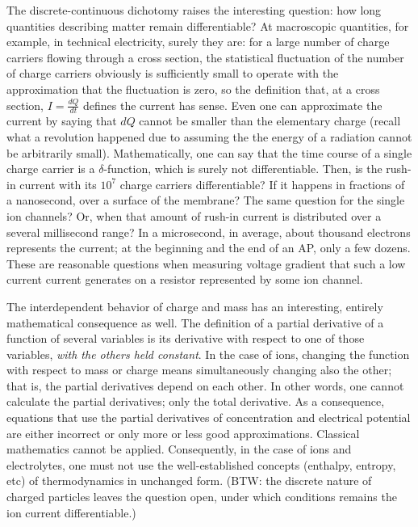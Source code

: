 {
The discrete-continuous dichotomy raises the interesting question: how long quantities describing matter remain differentiable? At macroscopic quantities, for example, 
in technical electricity, surely they are: for a large number of
charge carriers flowing through a cross section, the statistical
fluctuation of the number of charge carriers obviously is sufficiently small to operate with the approximation that
the fluctuation is zero, so the definition that, at a cross section, $I=\frac{dQ}{dt}$ defines the current has sense.
Even one can approximate the current by saying that
$dQ$ cannot be smaller than the elementary charge 
(recall what a revolution happened due to assuming
the the energy of a radiation cannot be arbitrarily small). Mathematically, one can say that the time course of a single
charge carrier is a $\delta$-function, which is surely not differentiable. Then, is the rush-in current with its 
$10^7$ charge carriers differentiable? If it happens 
in fractions of a nanosecond, over a surface of the membrane?
The same question for the single ion channels?
Or, when that amount of rush-in current is distributed
over a several millisecond range? In a microsecond,
in average, about thousand electrons represents the current;
at the beginning and the end of an \gls{AP}, only a few dozens.
These are reasonable questions when measuring voltage gradient
that such a low current current generates on a resistor
represented by some ion channel. 


The interdependent behavior of charge and mass has an interesting, entirely
mathematical consequence as well. 
The definition of a \hypertarget{PartialDerivative}{partial derivative} of a function of several variables is its derivative with respect to one of those variables,
\textit{with the others held constant}. In the case of ions, changing the function with respect to mass or charge means simultaneously changing also the other; that is, the partial derivatives depend on each other.
In other words, one cannot calculate the partial derivatives; only the total derivative.
As a consequence, equations that use the partial derivatives of concentration and electrical potential are either incorrect or only more or less good approximations. Classical mathematics cannot be applied.
Consequently, in the case of ions and electrolytes, one must not use the well-established concepts (enthalpy, entropy, etc) of thermodynamics in unchanged form. (BTW: the discrete nature of charged particles 
leaves the question open, under which conditions remains the 
ion current differentiable.)
}

